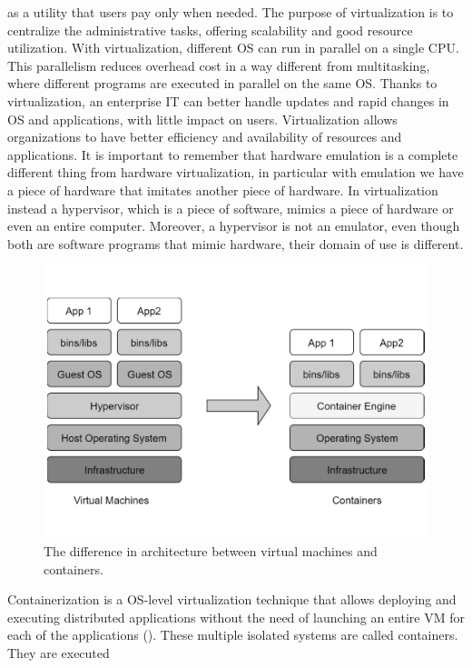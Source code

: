 as a utility that users pay only when needed. The purpose of virtualization
is to centralize the administrative tasks, offering scalability and
good resource utilization. With virtualization, different OS can run
in parallel on a single CPU. This parallelism reduces overhead cost
in a way different from multitasking, where different
programs are executed in parallel on the same OS. 
Thanks to virtualization, an enterprise IT can better handle updates and rapid changes in OS and applications, with little impact on users. Virtualization allows organizations
to have better efficiency and availability of resources and
applications.
It is important to remember that hardware emulation is a complete
different thing from hardware virtualization, in particular with emulation
we have a piece of hardware that imitates another piece of
hardware. In virtualization instead a hypervisor, which is a piece
of software, mimics a piece of hardware or even an entire computer.
Moreover, a hypervisor is not an emulator, even though both are
software programs that mimic hardware, their domain of use is different.
\begin{figure}
	\centering
	\includegraphics[width=\columnwidth]{Images/vm_vs_container.pdf}  
	\caption[Architecture of virtual machines and containers]{The difference in  architecture between virtual machines and containers.}
	\label{fig:vmVsContainer}
\end{figure}
Containerization is a OS-level virtualization technique that allows
deploying and executing distributed applications without the need
of launching an entire VM for each of the applications ().
These multiple isolated systems are called containers. They are executed
